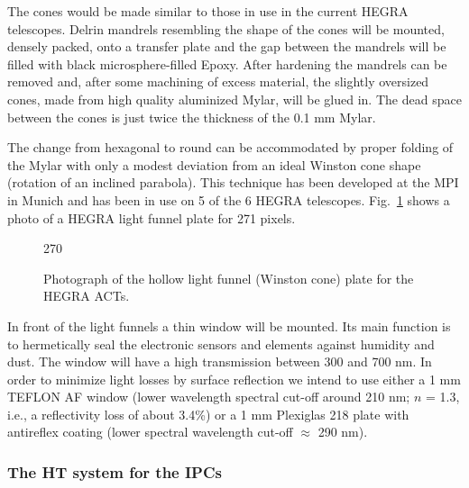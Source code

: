 The cones would be made similar to those in use in the current HEGRA
telescopes. Delrin mandrels resembling the shape of the cones will be
mounted, densely packed, onto a transfer plate and the gap between the
mandrels will be filled with black microsphere-filled Epoxy. After hardening
the mandrels can be removed and, after some machining of excess material,
the slightly oversized cones, made from high quality aluminized Mylar, will
be glued in. The dead space between the cones is just twice the thickness of
the 0.1 mm Mylar.

The change from hexagonal to round can be accommodated by proper folding of
the Mylar with only a modest deviation from an ideal Winston cone shape
(rotation of an inclined parabola). This technique has been developed at the
MPI in Munich and has been in use on 5 of the 6 HEGRA telescopes.
Fig.~\ref{fig-winston} shows a photo of a HEGRA light funnel plate for 271 pixels.

\begin{figure}[htb]
\begin{center}
\begin{turn}{270}
\end{turn}
\vspace{1cm}
\caption{Photograph of the hollow light
funnel (Winston cone) plate for the HEGRA ACTs.}
\label{fig-winston}
\end{center}
\end{figure}

In front of the light funnels a thin window will be mounted. Its main
function is to hermetically seal the electronic sensors and elements against
humidity and dust. The window will have a high transmission between 300 and
700 nm. In order to minimize light losses by surface reflection we intend to
use either a 1 mm TEFLON AF window (lower wavelength spectral cut-off around
210 nm; $n$ = 1.3, i.e., a reflectivity loss of about 3.4\%) or a 1 mm
Plexiglas 218 plate with antireflex coating (lower spectral wavelength
cut-off $\approx $ 290 nm).

\subsubsection{The HT system for the IPCs}


